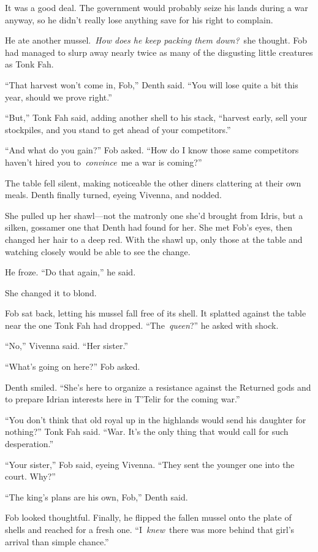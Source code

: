It was a good deal. The government would probably seize his lands during a war anyway, so he didn’t really lose anything save for his right to complain.

He ate another mussel.~\textit{How does he keep packing them down?}~she thought. Fob had managed to slurp away nearly twice as many of the disgusting little creatures as Tonk Fah.

“That harvest won’t come in, Fob,” Denth said. “You will lose quite a bit this year, should we prove right.”

“But,” Tonk Fah said, adding another shell to his stack, “harvest early, sell your stockpiles, and you stand to get ahead of your competitors.”

“And what do you gain?” Fob asked. “How do I know those same competitors haven’t hired you to~\textit{convince}~me a war is coming?”

The table fell silent, making noticeable the other diners clattering at their own meals. Denth finally turned, eyeing Vivenna, and nodded.

She pulled up her shawl—not the matronly one she’d brought from Idris, but a silken, gossamer one that Denth had found for her. She met Fob’s eyes, then changed her hair to a deep red. With the shawl up, only those at the table and watching closely would be able to see the change.

He froze. “Do that again,” he said.

She changed it to blond.

Fob sat back, letting his mussel fall free of its shell. It splatted against the table near the one Tonk Fah had dropped. “The~\textit{queen}?” he asked with shock.

“No,” Vivenna said. “Her sister.”

“What’s going on here?” Fob asked.

Denth smiled. “She’s here to organize a resistance against the Returned gods and to prepare Idrian interests here in T’Telir for the coming war.”

“You don’t think that old royal up in the highlands would send his daughter for nothing?” Tonk Fah said. “War. It’s the only thing that would call for such desperation.”

“Your sister,” Fob said, eyeing Vivenna. “They sent the younger one into the court. Why?”

“The king’s plans are his own, Fob,” Denth said.

Fob looked thoughtful. Finally, he flipped the fallen mussel onto the plate of shells and reached for a fresh one. “I~\textit{knew}~there was more behind that girl’s arrival than simple chance.”

